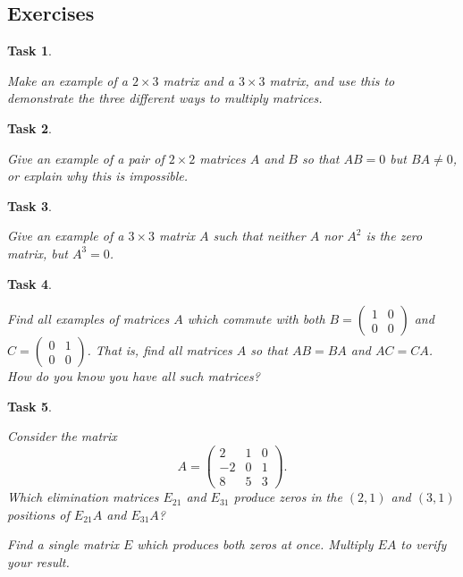\documentclass[10pt,]{book}
\theoremstyle{plain}
\numberwithin{equation}{section}
\newtheorem{task}{Task}[chapter]
\begin{document}
\subsection[Exercises]{Exercises}\label{subsection-40}
\begin{task}
\label{task-55}

        Make an example of a \(2\times 3\) matrix and a \(3\times 3\)
        matrix, and use this to demonstrate the three different ways to multiply
        matrices.
      \end{task}
\begin{task}
\label{task-56}

        Give an example of a pair of \(2\times 2\) matrices \(A\) and
        \(B\) so that \(AB = 0\) but \(BA\neq 0\), or explain why
        this is  impossible.
      \end{task}
\begin{task}
\label{task-57}

        Give an example of a \(3\times 3\) matrix \(A\) such that neither
        \(A\) nor \(A^2\) is the zero matrix, but \(A^3=0\).
      \end{task}
\begin{task}
\label{task-58}

        Find all examples of matrices \(A\) which commute with both
        \(B = \left( \begin{smallmatrix} 1 & 0 \\ 0 & 0
          \end{smallmatrix}\right)\) and
        \(C = \left( \begin{smallmatrix} 0 & 1 \\ 0 & 0
          \end{smallmatrix}\right)\). That is, find all matrices \(A\)
        so that \(AB = BA\) and \(AC= CA\). How do you know you have
        all such matrices?
      \end{task}
\begin{task}
\label{task-59}

          Consider the matrix
          \[
            A = \begin{pmatrix} 2 & 1 & 0 \\ -2 & 0 & 1 \\ 8 & 5 & 3 \end{pmatrix}.
          \]
          Which elimination matrices \(E_{21}\) and \(E_{31}\) produce zeros in the
          \((2,1)\) and \((3,1)\) positions of \(E_{21}A\)
          and \(E_{31}A\)?
\par

          Find a single matrix \(E\) which produces both zeros at once.
          Multiply \(EA\) to verify your result.
\end{task}
\end{document}
